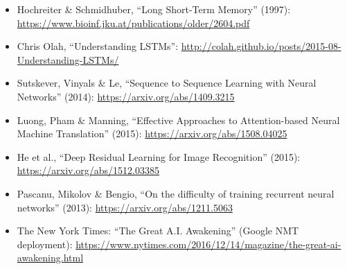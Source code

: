 \begin{itemize}
    \item Hochreiter \& Schmidhuber, ``Long Short-Term Memory'' (1997): \url{https://www.bioinf.jku.at/publications/older/2604.pdf}
    \item Chris Olah, ``Understanding LSTMs'': \url{http://colah.github.io/posts/2015-08-Understanding-LSTMs/}
    \item Sutskever, Vinyals \& Le, ``Sequence to Sequence Learning with Neural Networks'' (2014): \url{https://arxiv.org/abs/1409.3215}
    \item Luong, Pham \& Manning, ``Effective Approaches to Attention-based Neural Machine Translation'' (2015): \url{https://arxiv.org/abs/1508.04025}
    \item He et al., ``Deep Residual Learning for Image Recognition'' (2015): \url{https://arxiv.org/abs/1512.03385}
    \item Pascanu, Mikolov \& Bengio, ``On the difficulty of training recurrent neural networks'' (2013): \url{https://arxiv.org/abs/1211.5063}
    \item The New York Times: ``The Great A.I. Awakening'' (Google NMT deployment): \url{https://www.nytimes.com/2016/12/14/magazine/the-great-ai-awakening.html}
\end{itemize}


